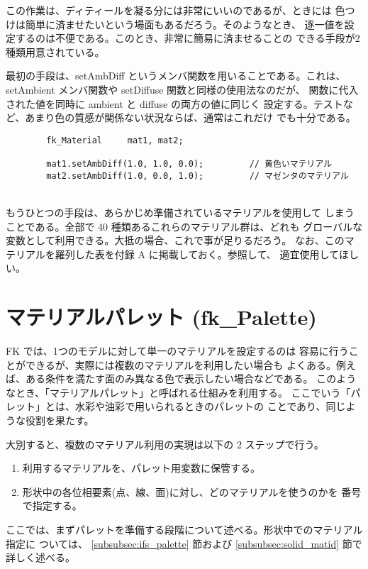この作業は、ディティールを凝る分には非常にいいのであるが、ときには
色つけは簡単に済ませたいという場面もあるだろう。そのようなとき、
逐一値を設定するのは不便である。このとき、非常に簡易に済ませることの
できる手段が2種類用意されている。

最初の手段は、setAmbDiff というメンバ関数を用いることである。これは、
setAmbient メンバ関数や setDiffuse 関数と同様の使用法なのだが、
関数に代入された値を同時に ambient と diffuse の両方の値に同じく
設定する。テストなど、あまり色の質感が関係ない状況ならば、通常はこれだけ
でも十分である。
\\
\begin{screen}
\begin{verbatim}
        fk_Material     mat1, mat2;

        mat1.setAmbDiff(1.0, 1.0, 0.0);         // 黄色いマテリアル
        mat2.setAmbDiff(1.0, 0.0, 1.0);         // マゼンタのマテリアル
\end{verbatim}
\end{screen}
\\
もうひとつの手段は、あらかじめ準備されているマテリアルを使用して
しまうことである。全部で 40 種類あるこれらのマテリアル群は、どれも
グローバルな変数として利用できる。大抵の場合、これで事が足りるだろう。
なお、このマテリアルを羅列した表を付録 A に掲載しておく。参照して、
適宜使用してほしい。
\section{マテリアルパレット (fk\_Palette)} \label{sec:mat_palette}
FK では、1つのモデルに対して単一のマテリアルを設定するのは
容易に行うことができるが、実際には複数のマテリアルを利用したい場合も
よくある。例えば、ある条件を満たす面のみ異なる色で表示したい場合などである。
このようなとき、「マテリアルパレット」と呼ばれる仕組みを利用する。
ここでいう「パレット」とは、水彩や油彩で用いられるときのパレットの
ことであり、同じような役割を果たす。

大別すると、複数のマテリアル利用の実現は以下の 2 ステップで行う。
\begin{enumerate}
 \item 利用するマテリアルを、パレット用変数に保管する。
 \item 形状中の各位相要素(点、線、面)に対し、どのマテリアルを使うのかを
	番号で指定する。
\end{enumerate}
ここでは、まずパレットを準備する段階について述べる。形状中でのマテリアル指定に
ついては、
\ref{subsubsec:ifs_palette} 節および
\ref{subsubsec:solid_matid} 節で詳しく述べる。

